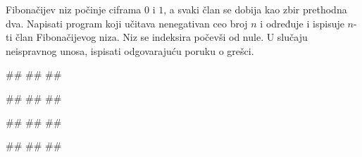 \begin{Exercise}[label=PET_31] 
Fibonačijev niz počinje ciframa $0$ i $1$, a svaki član se dobija
kao zbir prethodna dva. Napisati program koji učitava nenegativan ceo broj
$n$ i određuje i ispisuje $n$-ti član Fibonačijevog niza. Niz se indeksira
počevši od nule.
U slučaju neispravnog unosa, ispisati odgovarajuću poruku o grešci.

\begin{miditest}
\begin{upotreba}{1}
#\naslovInt#
##
##
\end{upotreba}
\end{miditest}
\begin{miditest}
\begin{upotreba}{2}
#\naslovInt#
##
##
\end{upotreba}
\end{miditest}

\begin{miditest}
\begin{upotreba}{3}
#\naslovInt#
##
##
\end{upotreba}
\end{miditest}
\begin{miditest}
\begin{upotreba}{4}
#\naslovInt#
##
##
\end{upotreba}
\end{miditest}

\end{Exercise}
\ifresenja
\begin{Answer}[ref=PET_31]
\end{Answer}
\fi


